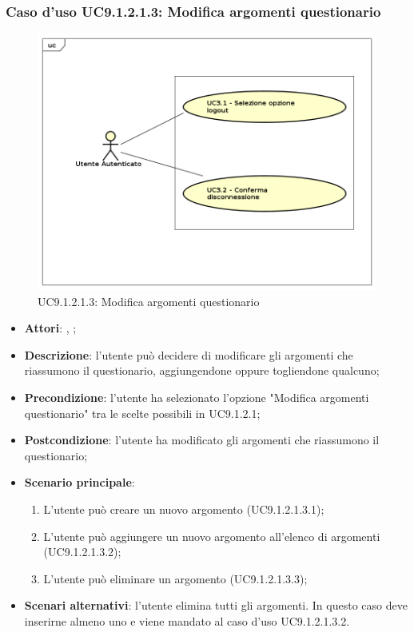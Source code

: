 					\subsubsection{Caso d'uso UC9.1.2.1.3: Modifica argomenti questionario}
					\label{UC9.1.2.1.3}
					\begin{figure}[h]
						\centering
					\includegraphics[scale=0.5,keepaspectratio]{UML/UC9.png}
						\caption{UC9.1.2.1.3: Modifica argomenti questionario}
					\end{figure}
					\FloatBarrier
					\begin{itemize}
						\item \textbf{Attori}: \uau, \uaupro;
						\item \textbf{Descrizione}: l'utente può decidere di modificare gli argomenti che riassumono il questionario, aggiungendone oppure togliendone qualcuno; 
						\item \textbf{Precondizione}: l'utente ha selezionato l'opzione "Modifica argomenti questionario" tra le scelte possibili in UC9.1.2.1; 
						\item \textbf{Postcondizione}: l'utente ha modificato gli argomenti che riassumono il questionario; 
						\item \textbf{Scenario principale}:
							\begin{enumerate}
								\item L'utente può creare un nuovo argomento (UC9.1.2.1.3.1);
								\item L'utente può aggiungere un nuovo argomento all'elenco di argomenti (UC9.1.2.1.3.2);
								\item L'utente può eliminare un argomento (UC9.1.2.1.3.3);
							\end{enumerate}
						\item \textbf{Scenari alternativi}: l'utente elimina tutti gli argomenti. In questo caso deve inserirne almeno uno e viene mandato al caso d'uso UC9.1.2.1.3.2.
					\end{itemize}
					
